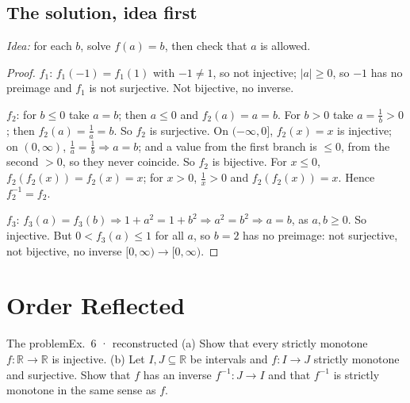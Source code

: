 \documentclass{kaelearn}
\begin{document}


\subsection{The solution, idea first}
\emph{Idea:} for each $b$, solve $f(a)=b$, then check that $a$ is allowed.
\begin{proof}
$f_1$: $f_1(-1)=f_1(1)$ with $-1\neq1$, so not injective; $|a|\ge0$, so $-1$ has no preimage and $f_1$ is not
surjective. Not bijective, no inverse.

$f_2$: for $b\le0$ take $a=b$; then $a\le0$ and $f_2(a)=a=b$. For $b>0$ take $a=\frac1b>0$; then $f_2(a)=\frac1a=b$.
So $f_2$ is surjective. On $(-\infty,0]$, $f_2(x)=x$ is injective; on $(0,\infty)$, $\frac1a=\frac1b\Rightarrow a=b$;
and a value from the first branch is $\le0$, from the second $>0$, so they never coincide. So $f_2$ is bijective. For
$x\le0$, $f_2(f_2(x))=f_2(x)=x$; for $x>0$, $\frac1x>0$ and $f_2(f_2(x))=x$. Hence $f_2^{-1}=f_2$.

$f_3$: $f_3(a)=f_3(b)\Rightarrow1+a^2=1+b^2\Rightarrow a^2=b^2\Rightarrow a=b$, as $a,b\ge0$. So injective. But
$0<f_3(a)\le1$ for all $a$, so $b=2$ has no preimage: not surjective, not bijective, no inverse
$[0,\infty)\to[0,\infty)$.
\end{proof}

\section{Order Reflected}

\begin{panel}[unbreakable]{The problem}{Ex.\ 6 · reconstructed}{}
(a) Show that every strictly monotone $f:\mathbb{R}\to\mathbb{R}$ is injective. (b) Let $I,J\subseteq\mathbb{R}$ be
intervals and $f:I\to J$ strictly monotone and surjective. Show that $f$ has an inverse $f^{-1}:J\to I$ and that
$f^{-1}$ is strictly monotone in the same sense as $f$.
\end{panel}
\end{document}
